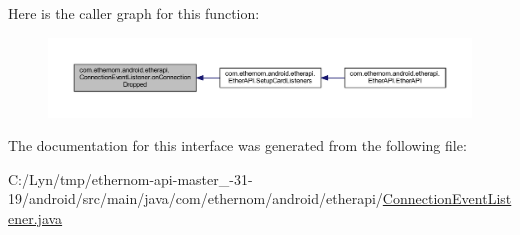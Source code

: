 Here is the caller graph for this function\+:\nopagebreak
\begin{figure}[H]
\begin{center}
\leavevmode
\includegraphics[width=350pt]{interfacecom_1_1ethernom_1_1android_1_1etherapi_1_1_connection_event_listener_acc0b5837e4cf7a81b6a3fb958be88067_icgraph}
\end{center}
\end{figure}


The documentation for this interface was generated from the following file\+:\begin{DoxyCompactItemize}
\item 
C\+:/\+Lyn/tmp/ethernom-\/api-\/master\+\_-\/31-\/19/android/src/main/java/com/ethernom/android/etherapi/\mbox{\hyperlink{_connection_event_listener_8java}{Connection\+Event\+Listener.\+java}}\end{DoxyCompactItemize}
